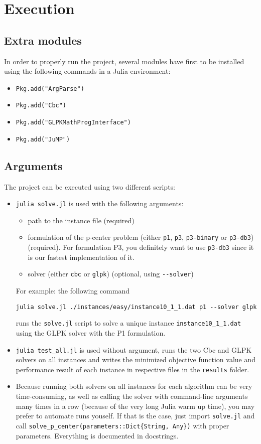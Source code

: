 \section{Execution}

\subsection{Extra modules}
In order to properly run the project, several modules have first to be installed using the following commands in a Julia environment:
\begin{itemize}
	\item \verb+Pkg.add("ArgParse")+
	\item \verb+Pkg.add("Cbc")+
	\item \verb+Pkg.add("GLPKMathProgInterface")+
	\item \verb+Pkg.add("JuMP")+
\end{itemize}

\subsection{Arguments}
The project can be executed using two different scripts:
\begin{itemize}
	\item \verb+julia solve.jl+ is used with the following arguments:
		\begin{itemize}
		\item path to the instance file (required)
		\item formulation of the p-center problem (either \verb+p1+, \verb+p3+, \verb+p3-binary+ or \verb+p3-db3+) (required).
		For formulation P3, you definitely want to use \verb+p3-db3+ since it is our fastest implementation of it.
		\item solver (either \verb+cbc+ or \verb+glpk+) (optional, using \verb+--solver+)
		\end{itemize}
	For example: the following command
	\begin{center}
		\verb+julia solve.jl ./instances/easy/instance10_1_1.dat p1 --solver glpk+
	\end{center}	 
	runs the \verb+solve.jl+ script to solve a unique instance \verb+instance10_1_1.dat+ using the GLPK solver with the P1 formulation. 
	\item \verb+julia test_all.jl+ is used without argument, runs the two Cbc and GLPK solvers on all instances and writes the minimized objective function value and performance result of each instance in respective files in the \verb+results+ folder.
	\item Because running both solvers on all instances for each algorithm can be very time-consuming, as well as calling
	the solver with command-line arguments many times in a row (because of the very long
	Julia warm up time), you may prefer to automate runs youself.
	If that is the case, just import \verb+solve.jl+ and call
	\verb+solve_p_center(parameters::Dict{String, Any})+ with proper
	parameters. Everything is documented in docstrings.
\end{itemize}